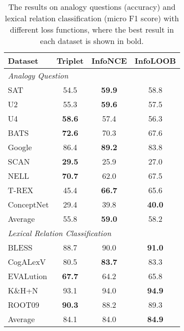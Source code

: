 \documentclass[3p]{elsarticle}
\begin{document}
{\begin{table}[!t]
\centering
\begin{tabular}{lccc}
\toprule
Dataset              & Triplet       & InfoNCE           & InfoLOOB      \\\midrule
\multicolumn{4}{l}{\textit{Analogy Question}}                                \\
SAT                  & 54.5          & \textbf{59.9} & 58.8          \\
U2                   & 55.3 & \textbf{59.6}          & 57.5          \\
U4                   & \textbf{58.6} & 57.4          & 56.3          \\
BATS                 & \textbf{72.6}          & 70.3 & 67.6          \\
Google               & 86.4 & \textbf{89.2} & 83.8\\
SCAN                 & \textbf{29.5} & 25.9 & 27.0 \\
NELL                 &\textbf{70.7} & 62.0 & 67.5 \\
T-REX                & 45.4& \textbf{66.7}& 65.6 \\
ConceptNet           & 29.4 & 39.8 & \textbf{40.0}\\ \midrule
Average              & 55.8          & \textbf{59.0} & 58.2         \\ \midrule
\multicolumn{4}{l}{\textit{Lexical Relation Classification}}                  \\
BLESS                & 88.7	& 90.0	& \textbf{91.0}\\
CogALexV             & 80.5	& \textbf{83.7}	& 83.3 \\
EVALution            & \textbf{67.7}	& 64.2	& 65.8 \\
K\&H+N               & 93.1	& 94.0	& \textbf{94.9} \\
ROOT09               & \textbf{90.3}	& 88.2	& 89.3 \\
\midrule
Average              & 84.1	& 84.0	& \textbf{84.9} \\
\bottomrule
\end{tabular}
\caption{The results on analogy questions (accuracy) and lexical relation classification (micro F1 score) with different loss functions, where the best result in each dataset is shown in bold. }
\label{tab:relbert:result-loss-function}
\end{table}

}
\end{document}
